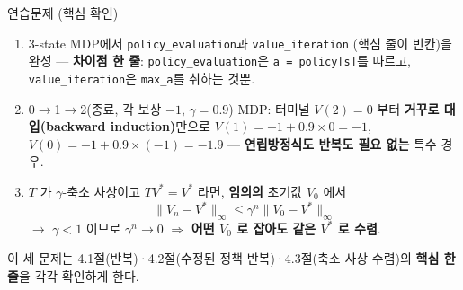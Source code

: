 \documentclass[aspectratio=169,11pt]{beamer}
\begin{document}

\begin{frame}{연습문제 (핵심 확인)}
  \begin{enumerate}
    \item {} 3-state MDP에서
      \texttt{policy\_evaluation}과 \texttt{value\_iteration}
      (핵심 줄이 빈칸)을 완성 --- \textbf{차이점 한 줄}:
      \texttt{policy\_evaluation}은 \texttt{a = policy[s]}를
      따르고, \texttt{value\_iteration}은 \texttt{max\_a}를
      취하는 것뿐.
    \item {} 0$\to$1$\to$2(종료, 각
      보상 $-1$, $\gamma = 0.9$) MDP: 터미널 $V(2) = 0$ 부터
      \textbf{거꾸로 대입(backward induction)}만으로
      $V(1) = -1 + 0.9 \times 0 = -1$, $V(0) = -1 + 0.9 \times
      (-1) = -1.9$ --- \textbf{연립방정식도 반복도 필요 없는}
      특수 경우.
    \item {} $T$ 가 $\gamma$-축소 사상이고
      $TV^{*} = V^{*}$ 라면, \textbf{임의의} 초기값 $V_0$ 에서
      \[
      \|V_n - V^{*}\|_\infty \le \gamma^n \|V_0 - V^{*}\|_\infty
      \]
      $\to$ $\gamma < 1$ 이므로 $\gamma^n \to 0$ $\Rightarrow$
      \textbf{어떤 $V_0$ 로 잡아도 같은 $V^{*}$ 로 수렴}.
  \end{enumerate}
  {\footnotesize 이 세 문제는 4.1절(반복)·4.2절(수정된 정책
  반복)·4.3절(축소 사상 수렴)의 \textbf{핵심 한 줄}을 각각
  확인하게 한다.}
\end{frame}
\end{document}
